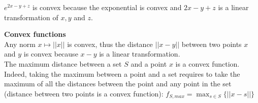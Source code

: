 %
 \begin{example}
\begin{leftbar}
	$e^{2x - y + z}$ is convex because the exponential is convex and  $2x - y + z$ is a linear transformation of $x, y$ and $z$.
	\end{leftbar}
	\end{example}
	
  \begin{example}
\begin{leftbar}	
	\textbf{Convex functions}\\
	Any norm $x \mapsto ||x ||$ is convex, thus the distance $||x-y||$ between two points $x$ and $y$ is convex because $x-y$ is a linear transformation.\\
    The maximum distance between a set $S$ and a point $x$ is a convex function. Indeed, taking the maximum between a point and a set requires to take the maximum of all the distances between the point and any point in the set (distance between two points is a convex function): $f_{S,max} = \max_{s \in S}\{ ||x - s|| \}$ 
	\end{leftbar}
	\end{example}
    
